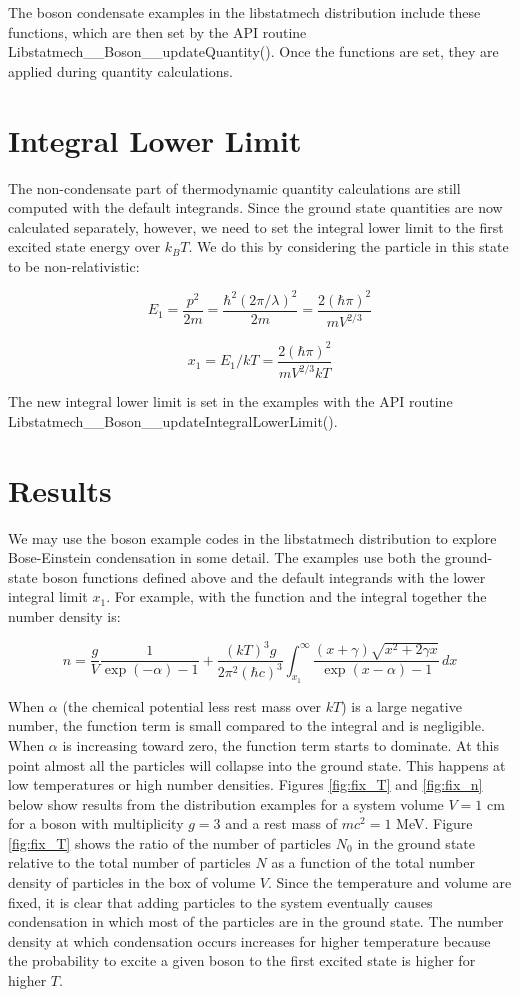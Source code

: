 \documentclass[pdftex]{article}    %
\begin{document}
The boson condensate 
examples in the libstatmech distribution include these
functions, which are then set by the API routine
Libstatmech\_\_Boson\_\_updateQuantity().
Once the functions are set, they are applied during quantity calculations.

\section{Integral Lower Limit}

The non-condensate part of thermodynamic quantity calculations are still
computed with the default integrands.
Since the ground state quantities are now calculated separately, however,
we need to set
the integral lower limit to the first excited state energy over $k_BT$.  We
do this by considering the particle in this state to be non-relativistic:

\[
E_1 = \frac{p^2}{2m} = \frac{\hbar^2(2\pi/\lambda)^2}{2m} = \frac{2(\hbar\pi)^2}{mV^{2/3}}
\]

\[
x_1 = E_1/kT = \frac{2(\hbar\pi)^2}{mV^{2/3}kT}
\]

The new integral lower limit is set in the examples with the API
routine Libstatmech\_\_Boson\_\_updateIntegralLowerLimit().

\section{Results}

We may use the boson example codes in the libstatmech distribution to explore
Bose-Einstein condensation in some detail.  The examples use both
the ground-state boson functions defined above and the default integrands
with the lower integral limit $x_1$.  For example,
with the function and the integral together the number density is:

\[
n = \frac{g}{V} \frac{1}{{\exp}(-\alpha)-1}
  + \frac {(kT)^3g} {2\pi^2(\hbar c)^3}
  \int_{x_1}^{\infty}
  \frac {(x+\gamma)\sqrt{x^2+2\gamma x}} {{\exp}(x-\alpha)-1}
  \, dx
\]

When $\alpha$ (the chemical potential less rest mass over $kT$) is a large
negative number, the function term is small compared to the integral and 
is negligible.  When $\alpha$ is increasing toward zero, the
function term starts to dominate. At this point almost all the particles will
collapse into the ground state. This happens at low temperatures or high number
densities.  Figures \ref{fig:fix_T} and \ref{fig:fix_n}
below show results from the distribution examples
for a system volume $V = 1$ cm for a boson with multiplicity $g = 3$ and
a rest mass of $m c^2 = 1$ MeV.  Figure \ref{fig:fix_T} shows
the ratio of the number of particles $N_0$ in the ground state relative
to the total number of particles $N$ as a function
of the total number density of particles in the box of volume $V$.  Since
the temperature and volume are fixed, it is clear that adding particles to
the system eventually causes condensation in which most of the particles
are in the ground state.  The number density at which condensation occurs
increases for higher temperature because the probability to excite a given
boson to the first excited state is higher for higher $T$.
\end{document}
